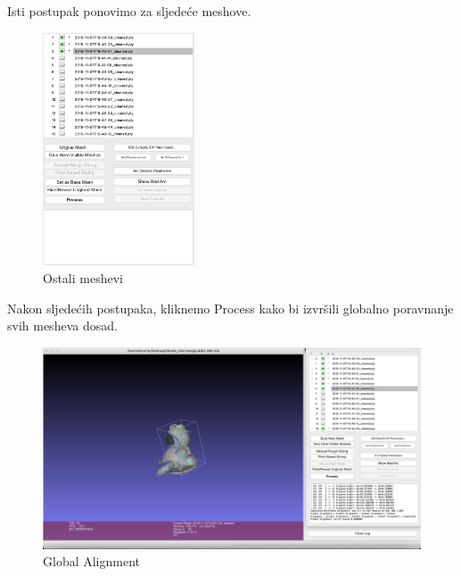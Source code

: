 \documentclass[12pt]{article} %
\begin{document}
		Isti postupak ponovimo za sljedeće meshove.
		\begin{figure}[H]
			\centering
			\includegraphics[width=0.4\textwidth]{screenshots/6.png}
			\caption{Ostali meshevi}
			\label{fig:yourlabel}
		\end{figure}
		
		Nakon sljedećih postupaka, kliknemo Process kako bi izvršili globalno poravnanje svih mesheva dosad.
		
		\begin{figure}[H]
			\centering
			\includegraphics[width=1\textwidth]{screenshots/8.png}
			\caption{Global Alignment}
			\label{fig:yourlabel}
		\end{figure}
		
\end{document}

